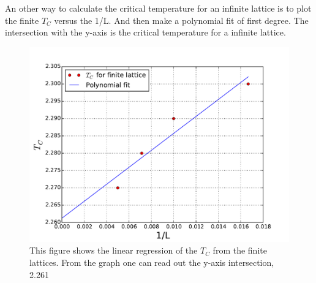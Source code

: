 An other way to calculate the critical temperature for an infinite lattice is to plot the finite $T_C$ versus the 1/L. And then make a polynomial fit of first degree. The intersection with the y-axis is the critical temperature for a infinite lattice.

\begin{figure}[H]
    \centering
    \includegraphics[width=0.5\linewidth]{result/bilder/tc/polyfit}
    \caption{This figure shows the linear regression of the $T_C$ from the finite lattices. From the graph one can read out the y-axis intersection, 2.261}
    \label{fig:polyfit}
\end{figure}





